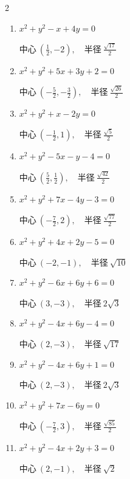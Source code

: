 \begin{multicols}{2}
\begin{enumerate}
  \item $x^{2}+y^{2}-x+4y=0$

        $\displaystyle 中心\: \left(\frac{1}{2},-2\right), \quad 半径 \ \frac{\sqrt{17}}{2}$

  \item $x^{2}+y^{2}+5x+3y+2=0$

        $\displaystyle 中心\: \left(-\frac{5}{2},-\frac{3}{2}\right), \quad 半径 \ \frac{\sqrt{26}}{2}$

  \item $x^{2}+y^{2}+x-2y=0$

        $\displaystyle 中心\: \left(-\frac{1}{2},1\right), \quad 半径 \ \frac{\sqrt{5}}{2}$

  \item $x^{2}+y^{2}-5x-y-4=0$

        $\displaystyle 中心\: \left(\frac{5}{2},\frac{1}{2}\right), \quad 半径 \ \frac{\sqrt{42}}{2}$

\columnbreak %

  \item $x^{2}+y^{2}+7x-4y-3=0$

        $\displaystyle 中心\: \left(-\frac{7}{2},2\right), \quad 半径 \ \frac{\sqrt{77}}{2}$

  \item $x^{2}+y^{2}+4x+2y-5=0$

        $\displaystyle 中心\: \left(-2,-1\right), \quad 半径 \ \sqrt{10}$

  \item $x^{2}+y^{2}-6x+6y+6=0$

        $\displaystyle 中心\: \left(3,-3\right), \quad 半径 \ 2\sqrt{3}$

  \item $x^{2}+y^{2}-4x+6y-4=0$

        $\displaystyle 中心\: \left(2,-3\right), \quad 半径 \ \sqrt{17}$

  \item $x^{2}+y^{2}-4x+6y+1=0$

        $\displaystyle 中心\: \left(2,-3\right), \quad 半径 \ 2\sqrt{3}$

  \item $x^{2}+y^{2}+7x-6y=0$

        $\displaystyle 中心\: \left(-\frac{7}{2},3\right), \quad 半径 \ \frac{\sqrt{85}}{2}$

  \item $x^{2}+y^{2}-4x+2y+3=0$

        $\displaystyle 中心\: \left(2,-1\right), \quad 半径 \ \sqrt{2}$


\end{enumerate}
\end{multicols}
